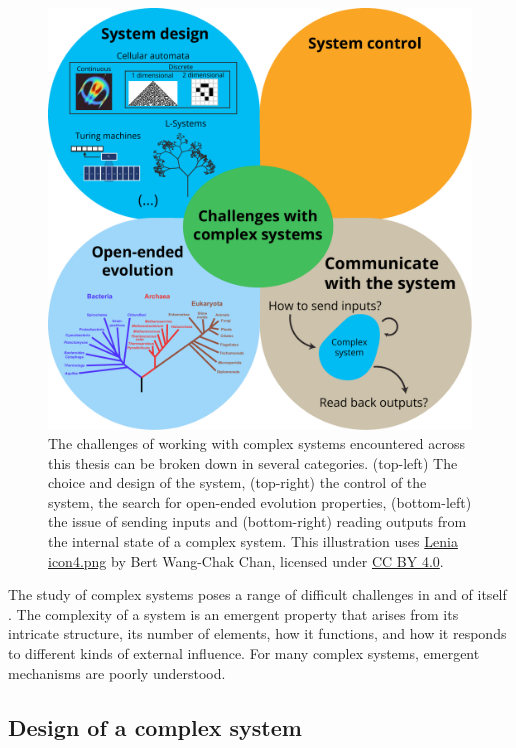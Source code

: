 \begin{figure}[htbp]
  \centering
  \includegraphics[width=.98\linewidth]{figures/challenges}
  \caption{The challenges of working with complex systems encountered across
    this thesis can be broken down in several categories. (top-left) The choice
    and design of the system, (top-right) the control of the system, the search
    for open-ended evolution properties, (bottom-left) the issue of sending
    inputs and (bottom-right) reading outputs from the internal state of a
    complex system. This illustration uses
    \href{https://commons.wikimedia.org/wiki/File:Lenia_icon4.png}{Lenia
      icon4.png} by Bert Wang-Chak Chan, licensed under
    \href{https://creativecommons.org/licenses/by-sa/4.0/}{CC BY 4.0}. }
  \label{fig:challenges}
\end{figure}

The study of complex systems poses a range of difficult challenges in and of
itself \parencite{sanmiguelChallengesComplexSystems2012}. The complexity of a system
is an emergent property that arises from its intricate structure, its number of
elements, how it functions, and how it responds to different kinds of external
influence. For many complex systems, emergent mechanisms are poorly
understood.


\subsection{Design of a complex system}

